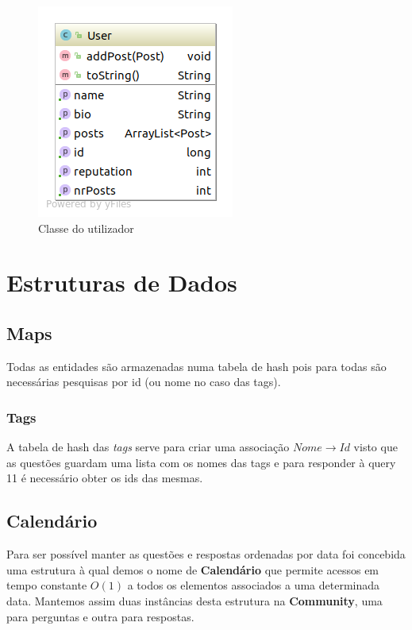 \documentclass[10pt,a4paper]{report}
\begin{document}
    \begin{figure}[h]
        \centering
        \includegraphics[width=0.4\textheight]{./images/User.png}
        \caption{Classe do utilizador}
    \end{figure}


\chapter{Estruturas de Dados}
    \section{Maps}
        Todas as entidades são armazenadas numa tabela de hash pois para todas
        são necessárias pesquisas por id (ou nome no caso das tags).

        \subsection{Tags}
        A tabela de hash das \textit{tags} serve para criar uma associação
        $Nome \to Id$ visto que as questões guardam uma lista com os nomes das
        tags e para responder à query 11 é necessário obter os ids das mesmas.

    \section{Calendário}
        Para ser possível manter as questões e respostas ordenadas por data foi
        concebida uma estrutura à qual demos o nome de \textbf{Calendário} que
        permite acessos em tempo constante $O(1)$ a todos os elementos
        associados a uma determinada data. Mantemos assim duas instâncias desta
        estrutura na \textbf{Community}, uma para perguntas e outra para
        respostas.
\end{document}
